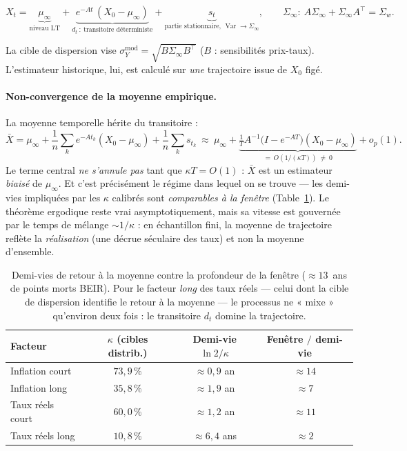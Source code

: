 \documentclass[11pt,a4paper]{article}
\theoremstyle{definition}
\DeclareMathOperator{\Var}{Var}
\newcommand{\transp}{^{\!\top}}
\begin{document}
\begin{definitionbox}
\[
X_t=\underbrace{\mu_\infty}_{\text{niveau LT}}+\underbrace{e^{-At}\,(X_0-\mu_\infty)}_{\textstyle d_t\ :\ \text{transitoire déterministe}}+\underbrace{s_t}_{\text{partie stationnaire, } \Var\to\Sigma_\infty},
\qquad \Sigma_\infty:\ A\Sigma_\infty+\Sigma_\infty A\transp=\Sigma_w.
\]
\end{definitionbox}

\noindent La cible de dispersion vise $\sigma^{\mathrm{mod}}_Y=\sqrt{B\Sigma_\infty B\transp}$ ($B$ : sensibilités prix-taux). L'estimateur historique, lui, est calculé sur \emph{une} trajectoire issue de $X_0$ figé.

\paragraph{Non-convergence de la moyenne empirique.} La moyenne temporelle hérite du transitoire :
\[
\bar X=\mu_\infty+\frac1n\sum_{k} e^{-At_k}(X_0-\mu_\infty)+\frac1n\sum_k s_{t_k}
\ \approx\ \mu_\infty+\underbrace{\tfrac1T A^{-1}\!\big(I-e^{-AT}\big)(X_0-\mu_\infty)}_{=\,O(1/(\kappa T))\ \neq\ 0}+o_p(1).
\]
Le terme central \emph{ne s'annule pas} tant que $\kappa T=O(1)$ : $\bar X$ est un estimateur \emph{biaisé} de $\mu_\infty$. Et c'est précisément le régime dans lequel on se trouve --- les demi-vies impliquées par les $\kappa$ calibrés sont \emph{comparables à la fenêtre} (Table~\ref{tab:halflife}). Le théorème ergodique reste vrai asymptotiquement, mais sa vitesse est gouvernée par le temps de mélange $\sim 1/\kappa$ : en échantillon fini, la moyenne de trajectoire reflète la \emph{réalisation} (une décrue séculaire des taux) et non la moyenne d'ensemble.

\begin{table}[h]
\centering\small
\renewcommand{\arraystretch}{1.25}
\begin{tabular}{@{}l c c c@{}}
\toprule
\textbf{Facteur} & $\kappa$ \textbf{(cibles distrib.)} & \textbf{Demi-vie} $\ln 2/\kappa$ & \textbf{Fenêtre $/$ demi-vie} \\
\midrule
Inflation court & $73{,}9\,\%$ & $\approx 0{,}9$ an & $\approx 14$ \\
Inflation long & $35{,}8\,\%$ & $\approx 1{,}9$ an & $\approx 7$ \\
Taux réels court & $60{,}0\,\%$ & $\approx 1{,}2$ an & $\approx 11$ \\
\rowcolor{nxlightblue} Taux réels long & $10{,}8\,\%$ & $\approx 6{,}4$ ans & $\approx 2$ \\
\bottomrule
\end{tabular}
\caption{Demi-vies de retour à la moyenne contre la profondeur de la fenêtre ($\approx 13$~ans de points morts BEIR). Pour le facteur \emph{long} des taux réels --- celui dont la cible de dispersion identifie le retour à la moyenne --- le processus ne « mixe » qu'environ deux fois : le transitoire $d_t$ domine la trajectoire.}
\label{tab:halflife}
\end{table}
\end{document}
